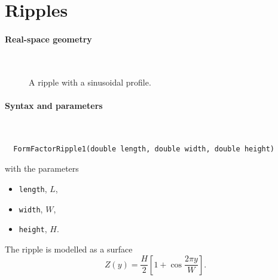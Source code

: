 \section{Ripples}\label{SRipple}


 \label{SRipple1}

\paragraph{Real-space geometry}\strut\\

\begin{figure}[H]
\hfill
{}
\hfill
{}
\hfill
{}
\hfill
\caption{A ripple with a sinusoidal profile.}
\end{figure}

\paragraph{Syntax and parameters}\strut\\[-2ex plus .2ex minus .2ex]
\begin{lstlisting}
  FormFactorRipple1(double length, double width, double height)
\end{lstlisting}
with the parameters
\begin{itemize}
\item \texttt{length}, $L$,
\item \texttt{width}, $W$,
\item \texttt{height}, $H$.
\end{itemize}

The ripple is modelled as a surface
\begin{equation*}
  Z(y) = \frac{H}{2}\left[ 1 + \cos\frac{2\pi y}{W} \right].
\end{equation*}

